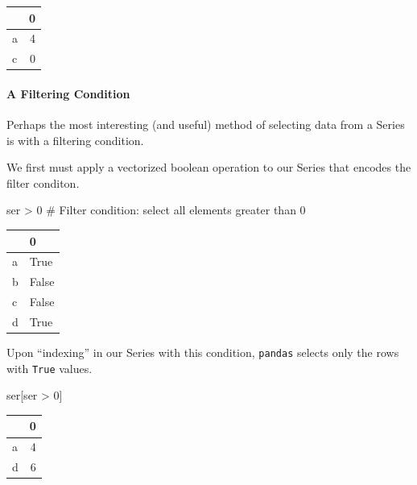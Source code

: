 \documentclass[
  letterpaper,
  DIV=11,
  numbers=noendperiod]{scrreprt}
\let\oldparagraph\paragraph
\renewcommand{\paragraph}[1]{\oldparagraph{#1}\mbox{}}
\newenvironment{Shaded}{\begin{snugshade}}{\end{snugshade}}
\newcommand{\CommentTok}[1]{\textcolor[rgb]{0.37,0.37,0.37}{#1}}
\newcommand{\DecValTok}[1]{\textcolor[rgb]{0.68,0.00,0.00}{#1}}
\newcommand{\NormalTok}[1]{\textcolor[rgb]{0.00,0.23,0.31}{#1}}
\newcommand{\OperatorTok}[1]{\textcolor[rgb]{0.37,0.37,0.37}{#1}}
\begin{document}
\begin{tabular}{lr}
\toprule
{} &  0 \\
\midrule
a &  4 \\
c &  0 \\
\bottomrule
\end{tabular}

\hypertarget{a-filtering-condition}{%
\paragraph{A Filtering Condition}\label{a-filtering-condition}}

Perhaps the most interesting (and useful) method of selecting data from
a Series is with a filtering condition.

We first must apply a vectorized boolean operation to our Series that
encodes the filter conditon.

\begin{Shaded}
\begin{Highlighting}[]
\NormalTok{ser }\OperatorTok{\textgreater{}} \DecValTok{0} \CommentTok{\# Filter condition: select all elements greater than 0}
\end{Highlighting}
\end{Shaded}

\begin{tabular}{ll}
\toprule
{} &      0 \\
\midrule
a &   True \\
b &  False \\
c &  False \\
d &   True \\
\bottomrule
\end{tabular}

Upon ``indexing'' in our Series with this condition, \texttt{pandas}
selects only the rows with \texttt{True} values.

\begin{Shaded}
\begin{Highlighting}[]
\NormalTok{ser[ser }\OperatorTok{\textgreater{}} \DecValTok{0}\NormalTok{] }
\end{Highlighting}
\end{Shaded}

\begin{tabular}{lr}
\toprule
{} &  0 \\
\midrule
a &  4 \\
d &  6 \\
\bottomrule
\end{tabular}
\end{document}
